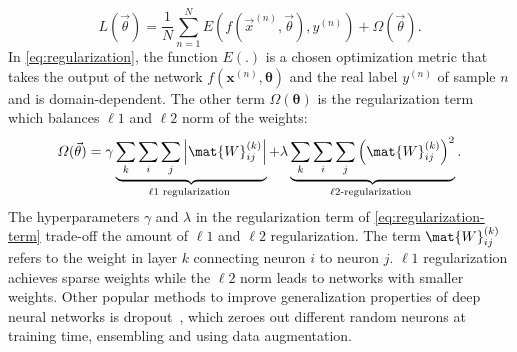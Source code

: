 \documentclass[\home/main.tex]{subfiles}
\begin{document}
\begin{equation}\label{eq:regularization}
	L(\vec{\theta})=\frac{1}{N} \sum_{n=1}^{N} E\left(f\left(\vec{x}^{(n)}, \vec{\theta}\right), y^{(n)}\right)+\Omega(\vec{\theta}).
\end{equation}
In \cref{eq:regularization}, the function $E(.)$ is a chosen optimization metric that takes the output of the network $f\left(\boldsymbol{x}^{(n)}, \boldsymbol{\theta}\right)$ and the real label $y^{(n)}$ of sample $n$ and is domain-dependent. The other term $\Omega(\boldsymbol{\theta})$ is the regularization term which balances $\ell 1$ and $\ell 2$ norm of the weights:
\begin{equation} \label{eq:regularization-term}
	\Omega(\vec{\theta})=\gamma \underbrace{\sum_{k} \sum_{i} \sum_{j}\left|\mat{W}_{i j}^{(k)}\right|}_{\ell 1 \text { regularization }}+\lambda \underbrace{\sum_{k} \sum_{i} \sum_{j}\left(\mat{W}_{i j}^{(k)}\right)^{2}}_{\ell 2 \text {-regularization }}.
\end{equation}
The hyperparameters $\gamma$ and $\lambda$ in the regularization term of \cref{eq:regularization-term} trade-off the amount of $\ell 1$ and $\ell 2$ regularization. The term $\mat{W}_{i j}^{(k)}$ refers to the weight in layer $k$ connecting neuron $i$ to neuron $j$. $\ell 1$ regularization achieves sparse weights while the $\ell 2$ norm leads to networks with smaller weights. Other popular methods to improve generalization properties of deep neural networks is dropout~\autocite{dropout}, which zeroes out different random neurons at training time, ensembling and using data augmentation.
\end{document}
